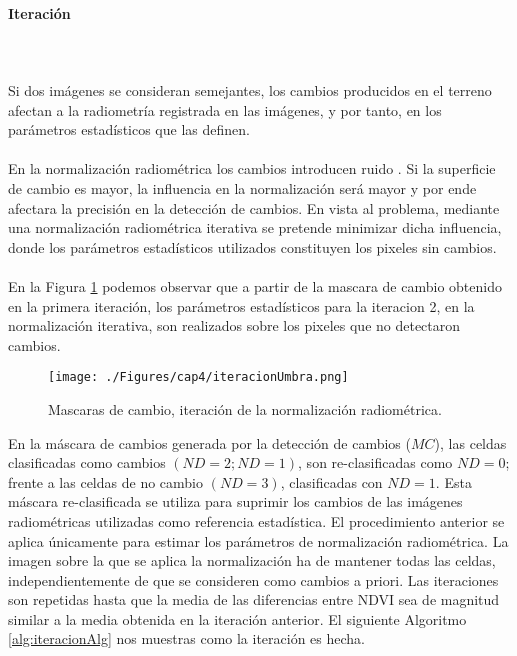 \paragraph{Iteraci\'on}\label{subsec:iteracion}\mbox{}\\\mbox{}\\
 Si dos im\'agenes se consideran semejantes, los cambios producidos en el terreno afectan a la radiometr\'ia registrada en las im\'agenes, y por tanto, en los par\'ametros estad\'isticos que las definen.\\~\\
En la normalizaci\'on radiom\'etrica los cambios introducen ruido \cite{martinez2013normalizacion}. Si la superficie de cambio es mayor, la influencia en la normalizaci\'on ser\'a mayor y por ende afectara la precisi\'on en la detecci\'on de cambios. En vista al problema, mediante una normalizaci\'on radiom\'etrica iterativa se pretende minimizar dicha influencia, donde los par\'ametros estad\'isticos utilizados constituyen los pixeles sin cambios.\\~\\
En la Figura \ref{fig:iteracionRadiometrica} podemos observar que a partir de la mascara de cambio obtenido en la primera iteraci\'on, los par\'ametros estad\'isticos para la iteracion 2, en la normalizaci\'on iterativa, son realizados sobre los pixeles que no detectaron cambios. 
	\begin{figure}[H]
		\centering
		\texttt{[image: ./Figures/cap4/iteracionUmbra.png]}
		\caption{Mascaras de cambio, iteraci\'on de la normalizaci\'on radiom\'etrica.}
		\label{fig:iteracionRadiometrica}
	\end{figure}
En la m\'ascara de cambios generada por la detecci\'on de cambios ($ MC $), las celdas clasificadas como cambios $ (ND = 2; ND = 1) $, son re-clasificadas como $ ND=0 $; frente a las celdas de no cambio $(ND = 3)  $, clasificadas con $ ND=1 $. Esta m\'ascara re-clasificada se utiliza para suprimir los cambios de las im\'agenes radiom\'etricas utilizadas como referencia estad\'istica. El procedimiento anterior se aplica \'unicamente para estimar los par\'ametros de normalizaci\'on radiom\'etrica. La imagen sobre la que se aplica la normalizaci\'on ha de mantener todas las celdas, independientemente de que se consideren como cambios a priori. Las iteraciones son repetidas hasta que la media de las diferencias entre NDVI sea de magnitud similar a la media obtenida en la iteraci\'on anterior. El siguiente Algoritmo \ref{alg:iteracionAlg} nos muestras como la iteraci\'on es hecha. 
